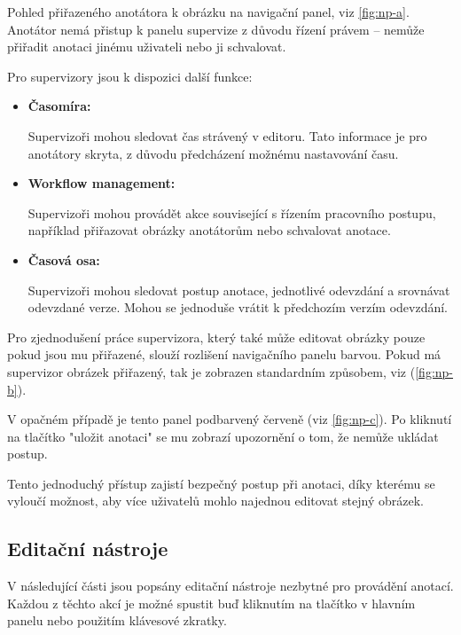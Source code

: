Pohled přiřazeného anotátora k obrázku na navigační panel, viz \vref{fig:np-a}. Anotátor nemá přistup k panelu supervize z důvodu řízení právem -- nemůže přiřadit anotaci jinému uživateli nebo ji schvalovat.


Pro supervizory jsou k dispozici další funkce:

\begin{itemize}
    \item \textbf{Časomíra:} 
    
    Supervizoři mohou sledovat čas strávený v editoru. Tato informace je pro anotátory skryta, z důvodu předcházení možnému nastavování času.
    
    \item \textbf{Workflow management:} 
    
    Supervizoři mohou provádět akce související s řízením pracovního postupu, například přiřazovat obrázky anotátorům nebo schvalovat anotace.

    \item \textbf{Časová osa:} 
    
    Supervizoři mohou sledovat postup anotace, jednotlivé odevzdání a srovnávat odevzdané verze. Mohou se jednoduše vrátit k předchozím verzím odevzdání.
\end{itemize}

Pro zjednodušení práce supervizora, který také může editovat obrázky pouze pokud jsou mu přiřazené, slouží rozlišení navigačního panelu barvou. Pokud má supervizor obrázek přiřazený, tak je zobrazen standardním způsobem, viz (\vref{fig:np-b}). 

V opačném případě je tento panel podbarvený červeně (viz \vref{fig:np-c}). Po kliknutí na tlačítko "uložit anotaci" se mu zobrazí upozornění o tom, že  nemůže ukládat postup.

Tento jednoduchý přístup zajistí bezpečný postup při anotaci, díky kterému se vyloučí možnost, aby více uživatelů mohlo najednou editovat stejný obrázek.

\subsection{Editační nástroje}
V následující části jsou popsány editační nástroje nezbytné pro provádění anotací. Každou z těchto akcí je možné spustit buď kliknutím na tlačítko v hlavním panelu nebo použitím klávesové zkratky.


